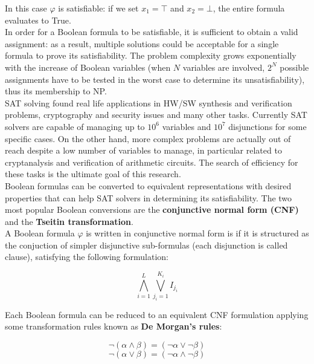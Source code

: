 In this case $\varphi$ is satisfiable: if we set $x_1 = \top$ and $x_2 = \bot$, the entire formula evaluates to True. \\
In order for a Boolean formula to be satisfiable, it is sufficient to obtain a valid assignment: as a result, multiple solutions could be acceptable for a single formula to prove its satisfiability. The problem complexity grows exponentially with the increase of Boolean variables (when $N$ variables are involved, $2^N$ possible assignments have to be tested in the worst case to determine its unsatisfiability), thus its membership to NP. \\
SAT solving found real life applications in HW/SW synthesis and verification problems\cite{satsynth}, cryptography \cite{crypto} and security issues \cite{satsec} and many other tasks. Currently SAT solvers are capable of managing up to $10^6$ variables and $10^7$ disjunctions for some specific cases. On the other hand, more complex problems are actually out of reach despite a low number of variables to manage, in particular related to cryptanalysis and verification of arithmetic circuits. The search of efficiency for these tasks is the ultimate goal of this research. \\
Boolean formulas can be converted to equivalent representations with desired properties that can help SAT solvers in determining its satisfiability. The two most popular Boolean conversions are the \textbf{conjunctive normal form (CNF)} and the \textbf{Tseitin transformation}. \\
A Boolean formula $\varphi$ is written in conjunctive normal form is if it is structured as the conjuction of simpler disjunctive sub-formulas (each disjunction is called clause), satisfying the following formulation:

\begin{equation}
    \bigwedge_{i=1}^L \bigvee_{j_i=1}^{K_i} I_{j_i}
\end{equation}

Each Boolean formula can be reduced to an equivalent CNF formulation applying some transformation rules known as \textbf{De Morgan's rules}:

\begin{equation}
    \neg (\alpha \wedge \beta) = (\neg \alpha \vee \neg \beta)
\end{equation}
\begin{equation}
    \neg (\alpha \vee \beta) = (\neg \alpha \wedge \neg \beta)
\end{equation}


